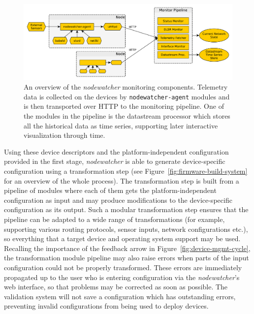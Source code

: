 \documentclass[5p,sort&compress]{elsarticle}
\newcommand{\nodewatcher}{\textit{nodewatcher}}
\begin{document}
\begin{figure}
  \centering
  \includegraphics[scale=0.5]{figures/monitoring-pipeline.pdf}
  \caption{An overview of the \nodewatcher{} monitoring components. Telemetry data is collected on the devices by \texttt{nodewatcher-agent} modules and is then transported over HTTP to the monitoring pipeline. One of the modules in the pipeline is the datastream processor which stores all the historical data as time series, supporting later interactive visualization through time.}
  \label{fig:monitoring-pipeline}
\end{figure}

Using these device descriptors and the platform-independent configuration provided in the first stage, \nodewatcher{} is able to generate device-specific configuration using a transformation step (see Figure~\ref{fig:firmware-build-system} for an overview of the whole process).
The transformation step is built from a pipeline of modules where each of them gets the platform-independent configuration as input and may produce modifications to the device-specific configuration as its output.
Such a modular transformation step ensures that the pipeline can be adapted to a wide range of transformations (for example, supporting various routing protocols, sensor inputs, network configurations etc.), so everything that a target device and operating system support may be used.
Recalling the importance of the feedback arrow in Figure~\ref{fig:device-mgmt-cycle}, the transformation module pipeline may also raise errors when parts of the input configuration could not be properly transformed.
These errors are immediately propagated up to the user who is entering configuration via the \nodewatcher{}'s web interface, so that problems may be corrected as soon as possible.
The validation system will not save a configuration which has outstanding errors, preventing invalid configurations from being used to deploy devices.
\end{document}

